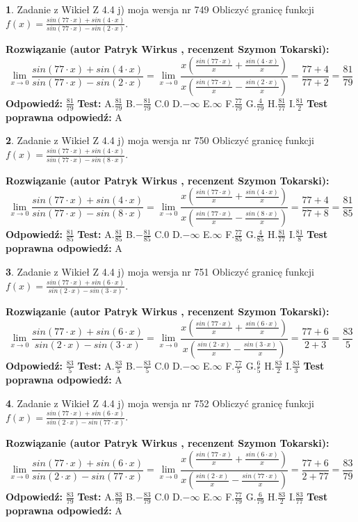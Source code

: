 \documentclass[12pt, a4paper]{article}
\theoremstyle{definition} %
\newtheorem{zad}{}
\newcommand{\zadStart}[1]{\begin{zad}#1\newline}
\newcommand{\zadStop}{\end{zad}}
\newcommand{\rozwStart}[2]{\noindent \textbf{Rozwiązanie (autor #1 , recenzent #2): }\newline}
\newcommand{\rozwStop}{\newline}
\newcommand{\odpStart}{\noindent \textbf{Odpowiedź:}\newline}
\newcommand{\odpStop}{\newline}
\newcommand{\testStart}{\noindent \textbf{Test:}\newline}
\newcommand{\testStop}{\newline}
\newcommand{\kluczStart}{\noindent \textbf{Test poprawna odpowiedź:}\newline}
\newcommand{\kluczStop}{\newline}
\begin{document}
\zadStart{Zadanie z Wikieł Z 4.4 j) moja wersja nr 749}
Obliczyć granicę funkcji $f(x)=\frac{sin(77\cdot x) +sin(4\cdot x)}{sin(77\cdot x) -sin(2\cdot x)}$.
\zadStop
\rozwStart{Patryk Wirkus}{Szymon Tokarski}
$$\lim\limits_{x\to 0}\frac{sin(77\cdot x) +sin(4\cdot x)}{sin(77\cdot x) -sin(2\cdot x)}=\lim\limits_{x\to 0}\frac{x(\frac{sin(77\cdot x)}{x}+\frac{sin(4\cdot x)}{x})}{x(\frac{sin(77\cdot x)}{x}-\frac{sin(2\cdot x)}{x})}=\frac{77+4}{77+2} = \frac{81}{79}$$
\rozwStop
\odpStart
$\frac{81}{79}$
\odpStop
\testStart
A.$\frac{81}{79}$
B.$-\frac{81}{79}$
C.$0$
D.$-\infty$
E.$\infty$
F.$\frac{77}{79}$
G.$\frac{4}{79}$
H.$\frac{81}{77}$
I.$\frac{81}{2}$
\testStop
\kluczStart
A
\kluczStop



\zadStart{Zadanie z Wikieł Z 4.4 j) moja wersja nr 750}
Obliczyć granicę funkcji $f(x)=\frac{sin(77\cdot x) +sin(4\cdot x)}{sin(77\cdot x) -sin(8\cdot x)}$.
\zadStop
\rozwStart{Patryk Wirkus}{Szymon Tokarski}
$$\lim\limits_{x\to 0}\frac{sin(77\cdot x) +sin(4\cdot x)}{sin(77\cdot x) -sin(8\cdot x)}=\lim\limits_{x\to 0}\frac{x(\frac{sin(77\cdot x)}{x}+\frac{sin(4\cdot x)}{x})}{x(\frac{sin(77\cdot x)}{x}-\frac{sin(8\cdot x)}{x})}=\frac{77+4}{77+8} = \frac{81}{85}$$
\rozwStop
\odpStart
$\frac{81}{85}$
\odpStop
\testStart
A.$\frac{81}{85}$
B.$-\frac{81}{85}$
C.$0$
D.$-\infty$
E.$\infty$
F.$\frac{77}{85}$
G.$\frac{4}{85}$
H.$\frac{81}{77}$
I.$\frac{81}{8}$
\testStop
\kluczStart
A
\kluczStop



\zadStart{Zadanie z Wikieł Z 4.4 j) moja wersja nr 751}
Obliczyć granicę funkcji $f(x)=\frac{sin(77\cdot x) +sin(6\cdot x)}{sin(2\cdot x) -sin(3\cdot x)}$.
\zadStop
\rozwStart{Patryk Wirkus}{Szymon Tokarski}
$$\lim\limits_{x\to 0}\frac{sin(77\cdot x) +sin(6\cdot x)}{sin(2\cdot x) -sin(3\cdot x)}=\lim\limits_{x\to 0}\frac{x(\frac{sin(77\cdot x)}{x}+\frac{sin(6\cdot x)}{x})}{x(\frac{sin(2\cdot x)}{x}-\frac{sin(3\cdot x)}{x})}=\frac{77+6}{2+3} = \frac{83}{5}$$
\rozwStop
\odpStart
$\frac{83}{5}$
\odpStop
\testStart
A.$\frac{83}{5}$
B.$-\frac{83}{5}$
C.$0$
D.$-\infty$
E.$\infty$
F.$\frac{77}{5}$
G.$\frac{6}{5}$
H.$\frac{83}{2}$
I.$\frac{83}{3}$
\testStop
\kluczStart
A
\kluczStop



\zadStart{Zadanie z Wikieł Z 4.4 j) moja wersja nr 752}
Obliczyć granicę funkcji $f(x)=\frac{sin(77\cdot x) +sin(6\cdot x)}{sin(2\cdot x) -sin(77\cdot x)}$.
\zadStop
\rozwStart{Patryk Wirkus}{Szymon Tokarski}
$$\lim\limits_{x\to 0}\frac{sin(77\cdot x) +sin(6\cdot x)}{sin(2\cdot x) -sin(77\cdot x)}=\lim\limits_{x\to 0}\frac{x(\frac{sin(77\cdot x)}{x}+\frac{sin(6\cdot x)}{x})}{x(\frac{sin(2\cdot x)}{x}-\frac{sin(77\cdot x)}{x})}=\frac{77+6}{2+77} = \frac{83}{79}$$
\rozwStop
\odpStart
$\frac{83}{79}$
\odpStop
\testStart
A.$\frac{83}{79}$
B.$-\frac{83}{79}$
C.$0$
D.$-\infty$
E.$\infty$
F.$\frac{77}{79}$
G.$\frac{6}{79}$
H.$\frac{83}{2}$
I.$\frac{83}{77}$
\testStop
\kluczStart
A
\kluczStop
\end{document}
